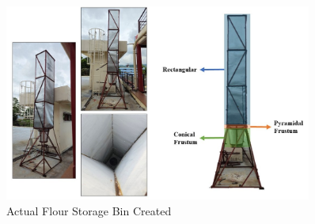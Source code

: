 \begin{figure}[H]
	\centering
	\includegraphics[width=0.9\textwidth]{Figures/constructed_storage_bin.jpg}
	\caption{Actual Flour Storage Bin Created}
	\label{ch4:fig:constructed-storage-bin}
\end{figure}






